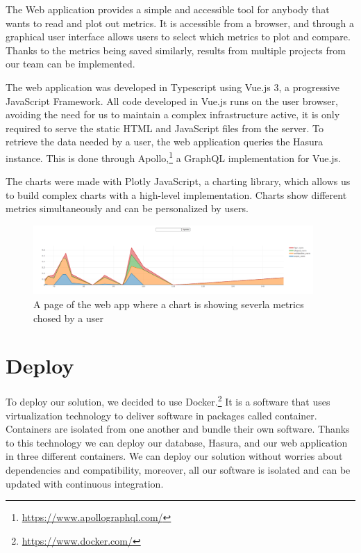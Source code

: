 The Web application provides a simple and accessible tool for anybody that wants to read and plot out metrics. It is accessible from a browser, and through a graphical user interface allows users to select which metrics to plot and compare. Thanks to the metrics being saved similarly, results from multiple projects from our team can be implemented.

The web application was developed in Typescript using Vue.js 3, a progressive JavaScript Framework. All code developed in Vue.js runs on the user browser, avoiding the need for us to maintain a complex infrastructure active, it is only required to serve the static HTML and JavaScript files from the server. To retrieve the data needed by a user, the web application queries the Hasura instance. This is done through Apollo,\footnote{\url{https://www.apollographql.com/}} a GraphQL implementation for Vue.js.

The charts were made with Plotly JavaScript, a charting library, which allows us to build complex charts with a high-level implementation. Charts show different metrics simultaneously and can be personalized by users.

\begin{figure}[H]
    \centering
    \includegraphics[width=0.95\textwidth]{./img/app.png}
    \caption{A page of the web app where a chart is showing severla metrics chosed by a user}
    \label{fig:chainsuser}
\end{figure}

\section{Deploy}
\label{sec:deploy}
To deploy our solution, we decided to use Docker.\footnote{\url{https://www.docker.com/}} It is a software that uses virtualization technology to deliver software in packages called container. Containers are isolated from one another and bundle their own software. Thanks to this technology we can deploy our database, Hasura, and our web application in three different containers. We can deploy our solution without worries about dependencies and compatibility, moreover, all our software is isolated and can be updated with continuous integration.

